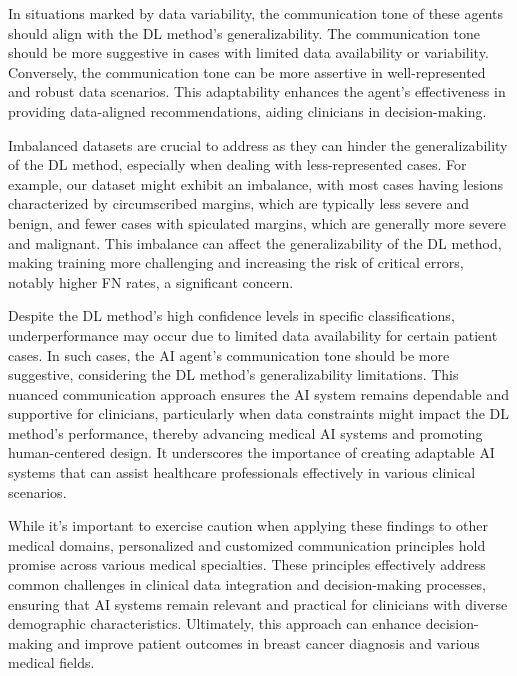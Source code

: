 \textcolor{revised}{In situations marked by data variability, the communication tone of these agents should align with the \ac{DL} method's generalizability.
The communication tone should be more suggestive in cases with limited data availability or variability.
Conversely, the communication tone can be more assertive in well-represented and robust data scenarios.
This adaptability enhances the agent's effectiveness in providing data-aligned recommendations, aiding clinicians in decision-making.}

\textcolor{revised}{Imbalanced datasets are crucial to address as they can hinder the generalizability of the \ac{DL} method, especially when dealing with less-represented cases.
For example, our dataset might exhibit an imbalance, with most cases having lesions characterized by circumscribed margins, which are typically less severe and benign, and fewer cases with spiculated margins, which are generally more severe and malignant.
This imbalance can affect the generalizability of the \ac{DL} method, making training more challenging and increasing the risk of critical errors, notably higher \ac{FN} rates, a significant concern.}

\textcolor{revised}{Despite the \ac{DL} method's high confidence levels in specific classifications, underperformance may occur due to limited data availability for certain patient cases.
In such cases, the \ac{AI} agent's communication tone should be more suggestive, considering the \ac{DL} method's generalizability limitations.
This nuanced communication approach ensures the \ac{AI} system remains dependable and supportive for clinicians, particularly when data constraints might impact the \ac{DL} method's performance, thereby advancing medical \ac{AI} systems and promoting human-centered design.
It underscores the importance of creating adaptable \ac{AI} systems that can assist healthcare professionals effectively in various clinical scenarios.}

\textcolor{revised}{While it's important to exercise caution when applying these findings to other medical domains, personalized and customized communication principles hold promise across various medical specialties.
These principles effectively address common challenges in clinical data integration and decision-making processes, ensuring that \ac{AI} systems remain relevant and practical for clinicians with diverse demographic characteristics.
Ultimately, this approach can enhance decision-making and improve patient outcomes in breast cancer diagnosis and various medical fields.}

